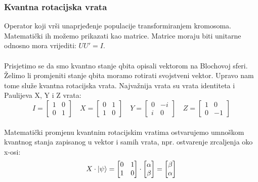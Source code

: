 \documentclass[times, utf8, zavrsni]{fer}
\begin{document}
\subsubsection{Kvantna rotacijska vrata}
Operator koji vrši unaprjeđenje populacije transformiranjem kromosoma. Matematički ih možemo prikazati kao matrice. Matrice moraju biti unitarne odnosno mora vrijediti: $UU' = I$.

\paragraph{}
Prisjetimo se da smo kvantno stanje qbita opisali vektorom na Blochovoj sferi. Želimo li promjeniti stanje qbita moramo rotirati svojstveni vektor. Upravo nam tome služe kvantna rotacijska vrata. Najvažnija vrata su vrata identiteta i Paulijeva X, Y i Z vrata:
\begin{equation}
I = 
\begin{bmatrix}
1 & 0 \\ 0 & 1
\end{bmatrix} \quad
X = 
\begin{bmatrix}
0 & 1 \\ 1 & 0
\end{bmatrix} \quad
Y = 
\begin{bmatrix}
0 & -i \\ i & 0
\end{bmatrix} \quad
Z = 
\begin{bmatrix}
1 & 0 \\ 0 & -1
\end{bmatrix}
\end{equation}

\paragraph{}
Matematički promjenu kvantnim rotacijskim vratima ostvarujemo umnoškom kvantnog stanja zapisanog u vektor i samih vrata, npr. ostvarenje zrcaljenja oko x-osi:
\begin{equation}
X\cdot \ket{\psi} = 
\begin{bmatrix}
0 & 1 \\ 1 & 0
\end{bmatrix} \cdot
\begin{bmatrix}
\alpha \\ \beta
\end{bmatrix}
= \begin{bmatrix}
\beta \\ \alpha
\end{bmatrix}
\end{equation}
\end{document}
